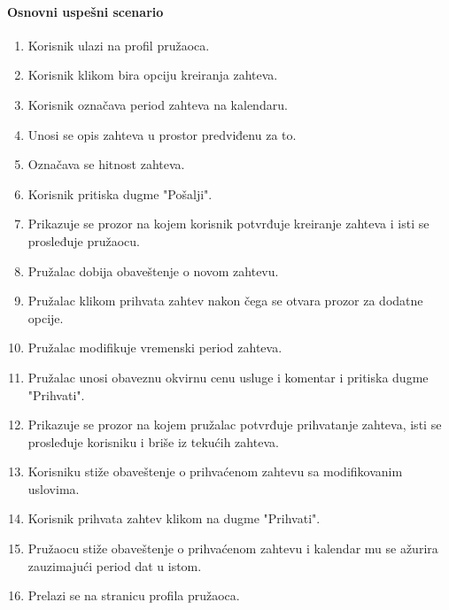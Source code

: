 \documentclass[a4paper,12pt]{report}
\begin{document}
			\paragraph*{Osnovni uspešni scenario}
				\begin{enumerate}
					\item Korisnik ulazi na profil pružaoca.
					\item Korisnik klikom bira opciju kreiranja zahteva.
					\item Korisnik označava period zahteva na kalendaru.
					\item Unosi se opis zahteva u prostor predviđenu za to.
					\item Označava se hitnost zahteva.
					\item Korisnik pritiska dugme "Pošalji".
					\item Prikazuje se prozor na kojem korisnik potvrđuje kreiranje zahteva i isti se prosleđuje pružaocu.
					\item Pružalac dobija obaveštenje o novom zahtevu.
					\item Pružalac klikom prihvata zahtev nakon čega se otvara prozor za dodatne opcije.
					\item Pružalac modifikuje vremenski period zahteva.
					\item Pružalac unosi obaveznu okvirnu cenu usluge i komentar i pritiska dugme "Prihvati".
					\item Prikazuje se prozor na kojem pružalac potvrđuje prihvatanje zahteva, isti se prosleđuje korisniku i briše iz tekućih zahteva.
					\item Korisniku stiže obaveštenje o prihvaćenom zahtevu sa modifikovanim uslovima.
					\item Korisnik prihvata zahtev klikom na dugme "Prihvati".
					\item Pružaocu stiže obaveštenje o prihvaćenom zahtevu i kalendar mu se ažurira zauzimajući period dat u istom.
					\item Prelazi se na stranicu profila pružaoca.
				\end{enumerate}
\end{document}
